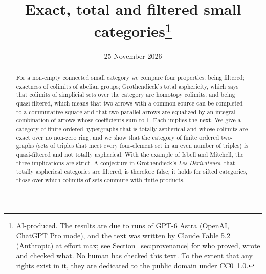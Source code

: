 \documentclass[11pt,a4paper]{article}
\title{Exact, total and filtered small categories\thanks{AI-produced. The
results are due to runs of GPT-6 Astra (OpenAI, ChatGPT Pro mode), and the text
was written by Claude Fable 5.2 (Anthropic) at effort max; see
Section~\ref{sec:provenance} for who proved, wrote and checked what. No
human has checked this text. To the extent that any rights exist in it, they
are dedicated to the public domain under CC0~1.0.}}
\author{}
\date{25 November 2026}
\theoremstyle{definition}
\begin{document}
\maketitle

\begin{abstract}
For a non-empty connected small category we compare four properties: being
filtered; exactness of colimits of abelian groups; Grothendieck's total
asphericity, which says that colimits of simplicial sets over the category
are homotopy colimits; and being quasi-filtered, which means that two arrows
with a common source can be completed to a commutative square and that two
parallel arrows are equalized by an integral combination of arrows whose
coefficients sum to $1$. Each implies the next. We give a category of finite
ordered hypergraphs that is totally aspherical and whose colimits are exact
over no non-zero ring, and we show that the category of finite ordered
two-graphs (sets of triples that meet every four-element set in an even
number of triples) is quasi-filtered and not totally aspherical. With the
example of Isbell and Mitchell, the three implications are strict. A
conjecture in Grothendieck's \emph{Les D\'erivateurs}, that totally
aspherical categories are filtered, is therefore false; it holds for sifted
categories, those over which colimits of sets commute with finite products.
\end{abstract}








\end{document}
